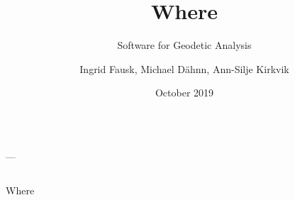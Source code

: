 \documentclass{beamer}
\title{Where}
\subtitle{Software for Geodetic Analysis}
\author{Ingrid Fausk, Michael D\"ahnn, Ann-Silje Kirkvik}
\institute{Norwegian Mapping Authority, Geodetic Institute}
\date{October 2019}
\makeatletter
\newcommand{\contact}{ingrid.fausk@kartverket.no\\ {\url https://github.com/kartverket/where}}
\makeatother
\begin{document}
\begin{frame}[t]

  \color{white}
  \vspace*{4cm}
  \begin{columns}
    \begin{column}[t]{.97\textwidth}
      {\bfseries\fontsize{88}{120}\selectfont \inserttitle}
      {\fontsize{88}{120}\selectfont\kern2cm---\kern2cm\insertsubtitle}
    \end{column}
  \end{columns}

  \vspace*{2cm}
  \begin{columns}

    \begin{column}[t]{.70\textwidth}
      {\fontsize{30}{36}\selectfont\setlength{\parskip}{15pt}}
    \end{column}

  \end{columns}
  
  \vspace*{3cm}

  \begin{columns}
    \begin{column}[t]{.9\textwidth}
      \begin{block}{Where}
        \begin{multicols}{2}
          
        \end{multicols}
      \end{block}
    \end{column}
  \end{columns}
  
  \vspace*{3cm}
 
  \begin{columns}
    \begin{column}[t]{.37\textwidth}


\end{column}
\end{columns}
\end{frame}
\end{document}
